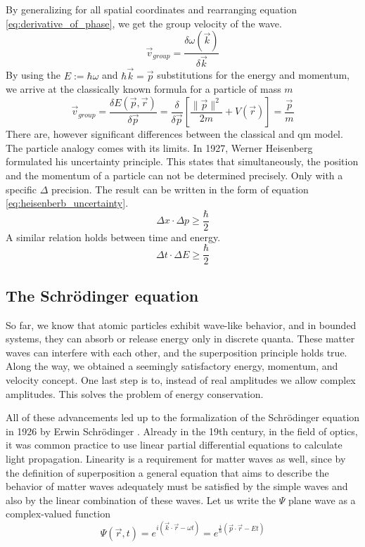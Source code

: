 By generalizing for all spatial coordinates and rearranging equation \ref{eq:derivative_of_phase}, we get the group velocity of the wave.
\begin{equation}
	\label{eq:group_velocity}
	\vec{v}_{group} = \frac{\delta \omega(\vec{k})}{\delta \vec{k}}
\end{equation}
By using the $E := \hbar \omega$ and $\hbar \vec{k} = \vec{p}$ substitutions for the energy and momentum, we arrive at the classically known formula for a particle of mass $m$
\begin{equation}
	\label{eq:classical_group_velocity}
	\vec{v}_{group} = \frac{\delta E(\vec{p}, \vec{r})}{\delta\vec{p}} = \frac{\delta}{\delta\vec{p}}\left[ \frac{\|\vec{p}\|^2}{2m} + V(\vec{r}) \right] = \frac{\vec{p}}{m}
\end{equation}
There are, however significant differences between the classical and \acrshort{qm} model.
The particle analogy comes with its limits.
In 1927, Werner Heisenberg formulated his uncertainty principle.
This states that simultaneously, the position and the momentum of a particle can not be determined precisely.
Only with a specific $\Delta$ precision.
The result can be written in the form of equation \ref{eq:heisenberb_uncertainty}.
\begin{equation}
	\label{eq:heisenberb_uncertainty}
	\Delta x \cdot \Delta p \geq \frac{\hbar}{2}
\end{equation}
A similar relation holds between time and energy.
\begin{equation}
	\label{}
	\Delta t \cdot \Delta E \geq \frac{\hbar}{2}
\end{equation}

\subsection{The Schrödinger equation}

So far, we know that atomic particles exhibit wave-like behavior, and in bounded systems, they can absorb or release energy only in discrete quanta.
These matter waves can interfere with each other, and the superposition principle holds true.
Along the way, we obtained a seemingly satisfactory energy, momentum, and velocity concept.
One last step is to, instead of real amplitudes we allow complex amplitudes.
This solves the problem of energy conservation.

All of these advancements led up to the formalization of the Schrödinger equation in 1926 by Erwin Schrödinger \cite{schrodinger1926}.
Already in the 19th century, in the field of optics, it was common practice to use linear partial differential equations to calculate light propagation.
Linearity is a requirement for matter waves as well, since by the definition of superposition a general equation that aims to describe the behavior of matter waves adequately must be satisfied by the simple waves and also by the linear combination of these waves.
Let us write the $\Psi$ plane wave as a complex-valued function
\begin{equation}
	\Psi(\vec{r}, t) = e^{i(\vec{k}\cdot\vec{r} - \omega t)} = e^{\frac{i}{\hbar}(\vec{p}\cdot\vec{r} - Et)}
\end{equation}

